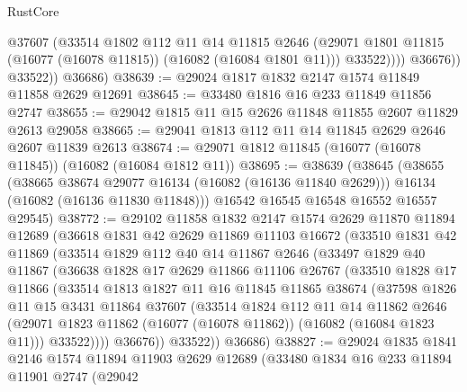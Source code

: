 \begin{lexlean}{RustCore}
\begin{coremodule}
                    @37607
                    (@33514
                      @1802
                      @112
                      @11
                      @14
                      @11815
                      @2646
                      (@29071 @1801 @11815 (@16077 (@16078 @11815)) (@16082 (@16084 @1801 @11)))
                      @33522))))
              @36676))
          @33522))
      @36686)
@38639 := @29024 @1817 @1832 @2147 @1574 @11849 @11858 @2629 @12691
@38645 := @33480 @1816 @16 @233 @11849 @11856 @2747
@38655 := @29042 @1815 @11 @15 @2626 @11848 @11855 @2607 @11829 @2613 @29058
@38665 := @29041 @1813 @112 @11 @14 @11845 @2629 @2646 @2607 @11839 @2613
@38674 := @29071 @1812 @11845 (@16077 (@16078 @11845)) (@16082 (@16084 @1812 @11))
@38695 := @38639
    (@38645
      (@38655
        (@38665 @38674 @29077 @16134 (@16082 (@16136 @11840 @2629)))
        @16134
        (@16082 (@16136 @11830 @11848)))
      @16542
      @16545
      @16548
      @16552
      @16557
      @29545)
@38772 := @29102
    @11858
    @1832
    @2147
    @1574
    @2629
    @11870
    @11894
    @12689
    (@36618
      @1831
      @42
      @2629
      @11869
      @11103
      @16672
      (@33510
        @1831
        @42
        @11869
        (@33514
          @1829
          @112
          @40
          @14
          @11867
          @2646
          (@33497
            @1829
            @40
            @11867
            (@36638
              @1828
              @17
              @2629
              @11866
              @11106
              @26767
              (@33510
                @1828
                @17
                @11866
                (@33514
                  @1813
                  @1827
                  @11
                  @16
                  @11845
                  @11865
                  @38674
                  (@37598
                    @1826
                    @11
                    @15
                    @3431
                    @11864
                    @37607
                    (@33514
                      @1824
                      @112
                      @11
                      @14
                      @11862
                      @2646
                      (@29071 @1823 @11862 (@16077 (@16078 @11862)) (@16082 (@16084 @1823 @11)))
                      @33522))))
              @36676))
          @33522))
      @36686)
@38827 := @29024
    @1835
    @1841
    @2146
    @1574
    @11894
    @11903
    @2629
    @12689
    (@33480
      @1834
      @16
      @233
      @11894
      @11901
      @2747
      (@29042

\end{coremodule}
\end{lexlean}
